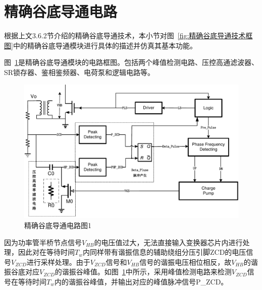 





\section{精确谷底导通电路}

根据上文3.6.2节介绍的精确谷底导通技术，本小节对图~\ref{fig:精确谷底导通技术框图}中的精确谷底导通模块进行具体的描述并仿真其基本功能。

图~\ref{fig:精确谷底导通电路图1}是精确谷底导通模块的电路框图。包括两个峰值检测电路、压控高通滤波器、SR锁存器、鉴相鉴频器、电荷泵和逻辑电路等。

\begin{figure}[htbp] 
    \centering
    \includegraphics[width=0.8\linewidth]{figures/精确谷底导通电路图1.pdf}
    \caption{精确谷底导通电路图1}
    \label{fig:精确谷底导通电路图1}
\end{figure}


因为功率管半桥节点信号$V_{HB}$的电压值过大，无法直接输入变换器芯片内进行处理，因此对在等待时间$T_w$内同样带有谐振信息的辅助绕组分压引脚ZCD的电压信号$V_{ZCD}$进行采样处理。由于$V_{ZCD}$信号和$V_{HB}$信号的谐振电压相位相反，故$V_{HB}$的谐振谷底对应$V_{ZCD}$的谐振谷峰值。如图~\ref{fig:精确谷底导通电路图1}中所示，采用峰值检测电路来检测$V_{ZCD}$信号在等待时间$T_w$内的谐振谷峰值，并输出对应的峰值脉冲信号P\_ZCD。

